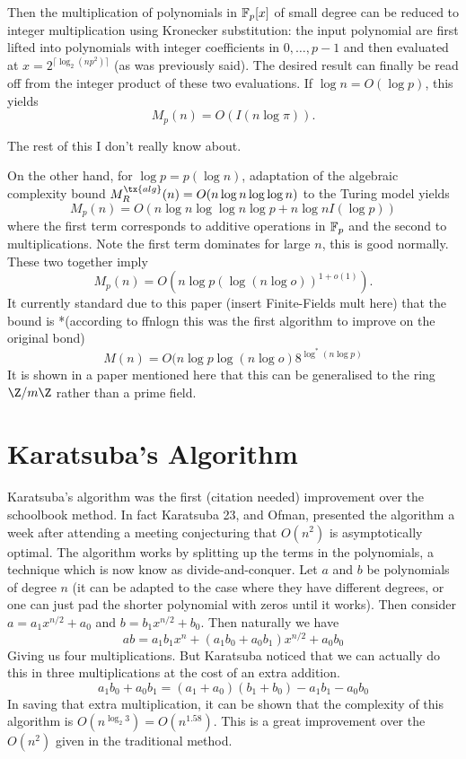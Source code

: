 Then the multiplication of polynomials in $\mathbb{F}_p[x]$ of small degree can be reduced to integer multiplication using Kronecker substitution: the input polynomial are first lifted into polynomials with integer coefficients in $0, \ldots, p - 1$ and then evaluated at $x = 2^{\lceil \log_2(n p^2) \rceil}$ (as was previously said). The desired result can finally be read off from the integer product of these two evaluations. If $\log n = O(\log p)$, this yields
\[
    M_p(n) = O(I(n \log \pi)).
\]

The rest of this I don't really know about.

On the other hand, for $\log p = p(\log n)$, adaptation of the algebraic complexity bound $M_R^\tx{alg}(n) = O(n \log n \log \log n)$ to the Turing model yields
\[
    M_p(n) = O(n \log n \log \log n \log p + n \log n I(\log p))
\]
where the first term corresponds to additive operations in $\mathbb{F}_p$ and the second to multiplications. Note the first term dominates for large $n$, this is good normally. These two together imply 
\[
    M_p(n) = O(n \log p (\log (n \log o))^{1 + o(1)}).
\]
It currently standard due to this paper (insert Finite-Fields mult here) that the bound is *(according to ffnlogn  this was the first algorithm to improve on the original bond)
\[
    M(n) = O(n \log p \log (n \log o) 8^{\log^\ast(n \log p)}
\]
It is shown in a paper mentioned here that this can be generalised to the ring $\Z / m\Z$ rather than a prime field.

\section{Karatsuba's Algorithm}
\label{sec:prelim-karatsuba}

Karatsuba's algorithm was the first (citation needed) improvement over the schoolbook method. In fact Karatsuba 23, and Ofman, presented the algorithm a week after attending a meeting conjecturing that $O(n^2)$ is asymptotically optimal. The algorithm works by splitting up the terms in the polynomials, a technique which is now know as divide-and-conquer. Let $a$ and $b$ be polynomials of degree $n$ (it can be adapted to the case where they have different degrees, or one can just pad the shorter polynomial with zeros until it works). Then consider $a = a_1x^{n/2} + a_0$ and $b = b_1x^{n/2} + b_0$. Then naturally we have
\[
    ab = a_1b_1x^n + (a_1b_0 + a_0b_1)x^{n/2} + a_0b_0
\]
Giving us four multiplications. But Karatsuba noticed that we can actually do this in three multiplications at the cost of an extra addition.
\[
    a_1b_0 + a_0b_1 = (a_1 + a_0)(b_1 + b_0) - a_1b_1 - a_0b_0
\]
In saving that extra multiplication, it can be shown that the complexity of this algorithm is $O(n^{\log_2 3}) = O(n^{1.58})$. This is a great improvement over the $O(n^2)$ given in the traditional method.

